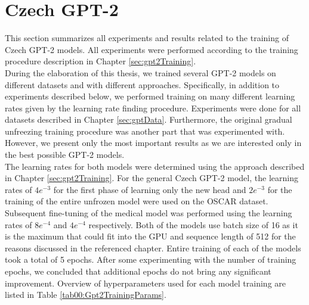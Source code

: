 \section{Czech GPT-2}
\label{sec:gpt2Experiments}
This section summarizes all experiments and results related to the training of Czech GPT-2 models. All experiments were performed according to the training procedure description in Chapter \ref{sec:gpt2Training}.\\

During the elaboration of this thesis, we trained several GPT-2 models on different datasets and with different approaches. Specifically, in addition to experiments described below, we performed training on many different learning rates given by the learning rate finding procedure. Experiments were done for all datasets described in Chapter \ref{sec:gptData}. Furthermore, the original gradual unfreezing training procedure was another part that was experimented with. However, we present only the most important results as we are interested only in the best possible GPT-2 models.\\

The learning rates for both models were determined using the approach described in Chapter \ref{sec:gpt2Training}. For the general Czech GPT-2 model, the learning rates of $4e^{-3}$ for the first phase of learning only the new head and $2e^{-3}$ for the training of the entire unfrozen model were used on the OSCAR dataset. Subsequent fine-tuning of the medical model was performed using the learning rates of $8e^{-4}$ and $4e^{-4}$ respectively. Both of the models use batch size of 16 as it is the maximum that could fit into the GPU and sequence length of 512 for the reasons discussed in the referenced chapter. Entire training of each of the models took a total of 5 epochs. After some experimenting with the number of training epochs, we concluded that additional epochs do not bring any significant improvement. Overview of hyperparameters used for each model training are listed in Table \ref{tab00:Gpt2TrainingParams}.

